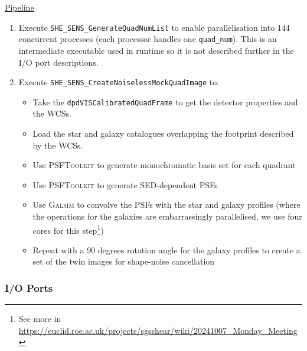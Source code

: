 \documentclass[11pt]{EuclidVIS}
\numberwithin{table}{section}
\numberwithin{figure}{section}
\begin{document}
\noindent \underline{Pipeline}
\begin{enumerate}
    \item Execute \texttt{SHE\_SENS\_GenerateQuadNumList} to enable parallelisation into 144 concurrent processes (each processor handles one \texttt{quad\_num}). This is an intermediate executable used in runtime so it is not described further in the I/O port descriptions.
    \item Execute \texttt{SHE\_SENS\_CreateNoiselessMockQuadImage} to:
        \begin{itemize}
            \item Take the \texttt{dpdVISCalibratedQuadFrame} to get the detector properties and the WCSs.
            \item Load the star and galaxy catalogues overlapping the footprint described by the WCSs.
            \item Use \textsc{PSFToolkit} to generate monochromatic basis set for each quadrant
            \item Use \textsc{PSFToolkit} to generate SED-dependent PSFs
            \item Use \textsc{Galsim} to convolve the PSFs with the star and galaxy profiles (where the operations for the galaxies are embarrassingly parallelised, we use four cores for this step\footnote{See more in \url{https://euclid.roe.ac.uk/projects/sgsshear/wiki/20241007_Monday_Meeting}})
            \item Repeat with a 90 degrees rotation angle for the galaxy profiles to create a set of the twin images for shape-noise cancellation
        \end{itemize}
\end{enumerate}

\subsubsection{I/O Ports}
\end{document}
